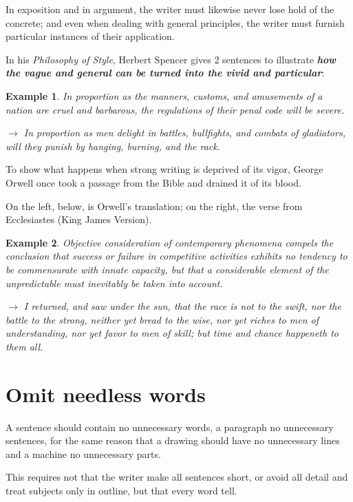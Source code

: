 \documentclass{book}
\numberwithin{equation}{section}
\newtheorem{example}{Example}[chapter]
\begin{document}
%
In exposition and in argument, the writer must likewise never lose hold of the concrete; and even when dealing with general principles, the writer must furnish particular instances of their application.

%
In his \textit{Philosophy of Style}, Herbert Spencer gives 2 sentences to illustrate \textbf{\textit{how the vague and general can be turned into the vivid and particular}}:
\begin{example}
    In proportion as the manners, customs, and amusements of a nation are cruel and barbarous, the regulations of their penal code will be severe.
    
    $\to$ In proportion as men delight in battles, bullfights, and combats of gladiators, will they punish by hanging, burning, and the rack.
\end{example}
To show what happens when strong writing is deprived of its vigor, George Orwell once took a passage from the Bible and drained it of its blood.

On the left, below, is Orwell's translation; on the right, the verse from Ecclesiastes (King James Version).
\begin{example}
    Objective consideration of contemporary phenomena compels the conclusion that success or failure in competitive activities exhibits no tendency to be commensurate with innate capacity, but that a considerable element of the unpredictable must inevitably be taken into account.
    
    $\to$ I returned, and saw under the sun, that the race is not to the swift, nor the battle to the strong, neither yet bread to the wise, nor yet riches to men of understanding, nor yet favor to men of skill; but time and chance happeneth to them all.
\end{example}

\section{Omit needless words}

A sentence should contain no unnecessary words, a paragraph no unnecessary sentences, for the same reason that a drawing should have no unnecessary lines and a machine no unnecessary parts.

This requires not that the writer make all sentences short, or avoid all detail and treat subjects only in outline, but that every word tell.
\end{document}
